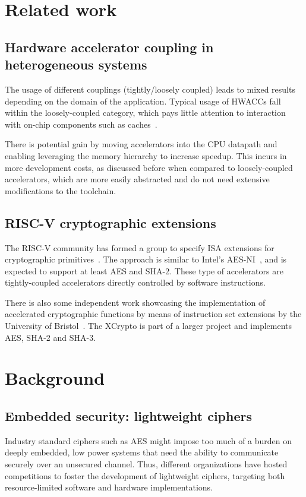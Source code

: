 \documentclass[10pt,conference]{IEEEtran}
\begin{document}
\section{Related work}

\subsection{Hardware accelerator coupling in heterogeneous systems}
The usage of different couplings (tightly/loosely coupled) leads to mixed
results depending on the domain of the application. Typical usage of HWACCs fall
within the loosely-coupled category, which pays little attention to interaction
with on-chip components such as caches~\cite{tightLoose}.

There is potential gain by moving accelerators into the CPU datapath and
enabling leveraging the memory hierarchy to increase speedup. This incurs in
more development costs, as discussed before when compared to loosely-coupled
accelerators, which are more easily abstracted and do not need extensive
modifications to the toolchain.

\subsection{RISC-V cryptographic extensions}
The RISC-V community has formed a group to specify ISA extensions for
cryptographic primitives~\cite{RiscVCrypto}. The approach is similar to Intel's
AES-NI~\cite{AESNI}, and is expected to support at least AES and SHA-2. These
type of accelerators are tightly-coupled accelerators directly controlled by
software instructions.

There is also some independent work showcasing the implementation of accelerated
cryptographic functions by means of instruction set extensions by the University
of Bristol~\cite{xcrypto}. The XCrypto is part of a larger project and
implements AES, SHA-2 and SHA-3.

\section{Background}


\subsection{Embedded security: lightweight ciphers}

Industry standard ciphers such as AES might impose too much of a burden on deeply
embedded, low power systems that need the ability to communicate securely over
an unsecured channel. Thus, different organizations have hosted competitions to
foster the development of lightweight ciphers, targeting both resource-limited
software and hardware implementations.
\end{document}
